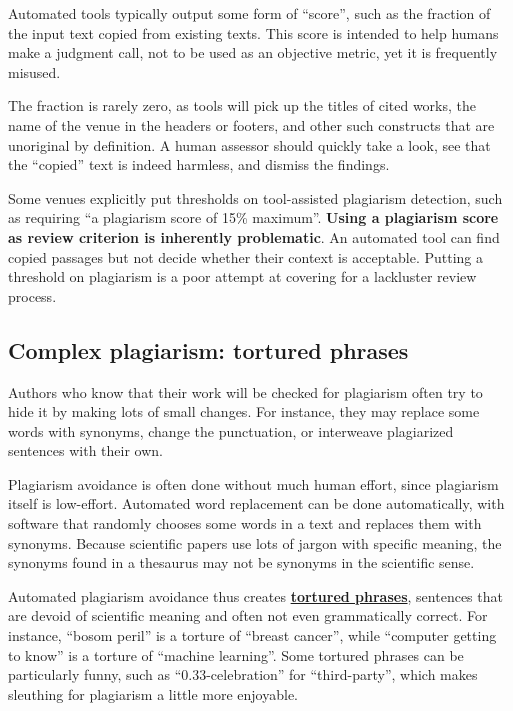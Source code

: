 \documentclass[letterpaper, 12pt]{article}
\begin{document}
Automated tools typically output some form of ``score'', such as the fraction of the input text copied from existing texts.
This score is intended to help humans make a judgment call, not to be used as an objective metric, yet it is frequently misused.

The fraction is rarely zero, as tools will pick up the titles of cited works, the name of the venue in the headers or footers, and other such constructs that are unoriginal by definition.
A human assessor should quickly take a look, see that the ``copied'' text is indeed harmless, and dismiss the findings.

Some venues explicitly put thresholds on tool-assisted plagiarism detection, such as requiring ``a plagiarism score of 15\% maximum''.
\textbf{Using a plagiarism score as review criterion is inherently problematic}.
An automated tool can find copied passages but not decide whether their context is acceptable.
Putting a threshold on plagiarism is a poor attempt at covering for a lackluster review process.

\subsection*{Complex plagiarism: tortured phrases}

Authors who know that their work will be checked for plagiarism often try to hide it by making lots of small changes.
For instance, they may replace some words with synonyms, change the punctuation, or interweave plagiarized sentences with their own.

Plagiarism avoidance is often done without much human effort, since plagiarism itself is low-effort.
Automated word replacement can be done automatically, with software that randomly chooses some words in a text and replaces them with synonyms.
Because scientific papers use lots of jargon with specific meaning, the synonyms found in a thesaurus may not be synonyms in the scientific sense.

Automated plagiarism avoidance thus creates \href{https://thebulletin.org/2022/01/bosom-peril-is-not-breast-cancer-how-weird-computer-generated-phrases-help-researchers-find-scientific-publishing-fraud/}{\textbf{tortured phrases}},
sentences that are devoid of scientific meaning and often not even grammatically correct.
For instance, ``bosom peril'' is a torture of ``breast cancer'',
while ``computer getting to know'' is a torture of ``machine learning''.
Some tortured phrases can be particularly funny, such as ``0.33-celebration'' for ``third-party'',
which makes sleuthing for plagiarism a little more enjoyable.
\end{document}
